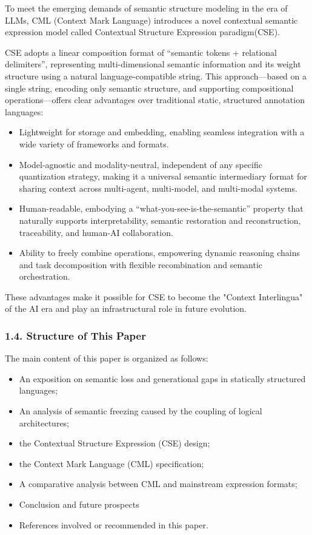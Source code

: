 \documentclass[conference]{IEEEtran}
\begin{document}
To meet the emerging demands of semantic structure modeling in the era
of LLMs, CML (Context Mark Language) introduces a novel contextual
semantic expression model called Contextual Structure Expression
paradigm(CSE).

CSE adopts a linear composition format of ``semantic tokens + relational
delimiters'', representing multi-dimensional semantic information and
its weight structure using a natural language-compatible string. This
approach---based on a single string, encoding only semantic structure,
and supporting compositional operations---offers clear advantages over
traditional static, structured annotation languages:

\begin{itemize}
\item
  Lightweight for storage and embedding, enabling seamless integration
  with a wide variety of frameworks and formats.
\end{itemize}

\begin{itemize}
\item
  Model-agnostic and modality-neutral, independent of any specific
  quantization strategy, making it a universal semantic intermediary
  format for sharing context across multi-agent, multi-model, and
  multi-modal systems.
\item
  Human-readable, embodying a ``what-you-see-is-the-semantic'' property
  that naturally supports interpretability, semantic restoration and
  reconstruction, traceability, and human-AI collaboration.
\item
  Ability to freely combine operations, empowering dynamic reasoning
  chains and task decomposition with flexible recombination and semantic
  orchestration.
\end{itemize}

These advantages make it possible for CSE to become the "Context
Interlingua" of the AI era and play an infrastructural role in future
evolution.

\subsubsection{1.4. Structure of This
Paper}\label{14-structure-of-this-paper}

The main content of this paper is organized as follows:

\begin{itemize}
\item
  An exposition on semantic loss and generational gaps in statically
  structured languages;
\item
  An analysis of semantic freezing caused by the coupling of logical
  architectures;
\item
  the Contextual Structure Expression (CSE) design;
\item
  the Context Mark Language (CML) specification;
\item
  A comparative analysis between CML and mainstream expression formats;
\item
  Conclusion and future prospects
\item
  References involved or recommended in this paper.
\end{itemize}
\end{document}
